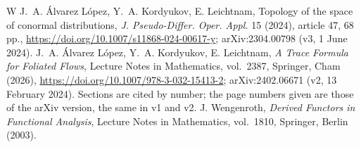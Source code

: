 \documentclass[11pt]{article}
\begin{document}
\vspace{-0.5em}
\begin{thebibliography}{W}\setlength{\itemsep}{0pt}\footnotesize
{} J.~A. \'Alvarez L\'opez, Y.~A. Kordyukov, E. Leichtnam, Topology of the space of conormal distributions, \emph{J. Pseudo-Differ. Oper. Appl.} 15 (2024), article 47, 68 pp., \url{https://doi.org/10.1007/s11868-024-00617-y}; arXiv:2304.00798 (v3, 1 June 2024).
 J.~A. \'Alvarez L\'opez, Y.~A. Kordyukov, E. Leichtnam, \emph{A Trace Formula for Foliated Flows}, Lecture Notes in Mathematics, vol.~2387, Springer, Cham (2026), \url{https://doi.org/10.1007/978-3-032-15413-2}; arXiv:2402.06671 (v2, 13 February 2024). Sections are cited by number; the page numbers given are those of the arXiv version, the same in v1 and v2.
 J. Wengenroth, \emph{Derived Functors in Functional Analysis}, Lecture Notes in Mathematics, vol.~1810, Springer, Berlin (2003).
\end{thebibliography}
\end{document}
